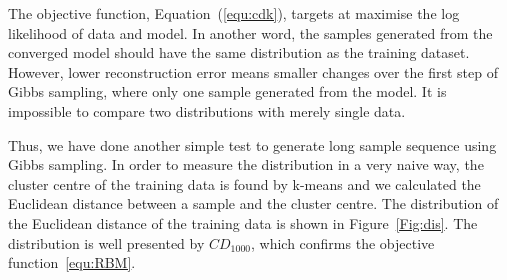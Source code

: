 The objective function, Equation~(\ref{equ:cdk}), targets at maximise the log likelihood of data and model.
In another word, the samples generated from the converged model should have the same distribution as the training dataset.
However, lower reconstruction error means smaller changes over the first step of Gibbs sampling, where only one sample generated from the model.
It is impossible to compare two distributions with merely single data.

Thus, we have done another simple test to generate long sample sequence using Gibbs sampling.
In order to measure the distribution in a very naive way, the cluster centre of the training data is found by k-means and we calculated the Euclidean distance between a sample and the cluster centre.
The distribution of the Euclidean distance of the training data is shown in Figure~\ref{Fig:dis}.
The distribution is well presented by $CD_{1000}$, which confirms the objective function~\ref{equ:RBM}.

